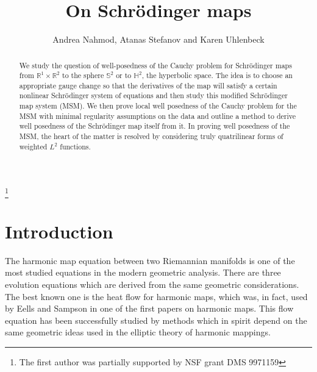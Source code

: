 \documentclass[draft,11pt,leqno]{amsart}
\newcommand{\rone}{\mathbb R^1}
\newcommand{\rtwo}{\mathbb R^2}
\newcommand{\stwo}{\mathbb S^2}
\begin{document}
\title{On Schr\"odinger maps}



\author[Nahmod, Stefanov and Uhlenbeck] {Andrea Nahmod, Atanas Stefanov and Karen Uhlenbeck}

\address{Andrea Nahmod,  Department of Mathematics and Statistics,
University of Massachusetts, \, Amherst, MA 01003-4515}

\address{Atanas Stefanov, Department of Mathematics and Statistics,
University of Massachusetts, \, Amherst, MA 01003-4515}
\address{Karen Uhlenbeck, Department of Mathematics, The University of Texas, 
Austin, TX 7871-1082}

\begin{abstract}
We study the question of well-posedness of the Cauchy problem for Schr\"odinger maps from $\rone \times \rtwo$ to the sphere $\stwo$ or to 
${\mathbb H^2}$, the hyperbolic space. The idea is to choose an 
appropriate gauge change so that the derivatives of the map will satisfy a certain nonlinear Schr\"odinger system of equations and then study 
this modified Schr\"odinger map system (MSM). 
We then prove local well posedness of the Cauchy problem for the MSM with 
minimal regularity assumptions on the data and outline a method 
to derive well posedness of the Schr\"odinger map itself from it. 
In proving well posedness of the MSM, the heart of the matter 
is resolved by considering truly quatrilinear forms of weighted 
$L^2$ functions. 
\end{abstract}

\thanks{The first author was partially supported by NSF
grant DMS 9971159}
\maketitle 

\vspace{.3cm}
\section{Introduction}
\vspace{.5cm}
The harmonic map equation between two Riemannian manifolds is one of the
most studied equations in the modern geometric analysis. There are three
evolution equations which are derived from the same geometric considerations.
The best known one is the heat flow for harmonic maps, 
which was, in fact, used  by Eells and Sampson \cite{EeS} in one of the 
first papers
on harmonic maps.  This flow equation has been successfully studied 
by methods which in spirit depend on the  same geometric ideas used 
in the elliptic theory of harmonic mappings.
\end{document}

